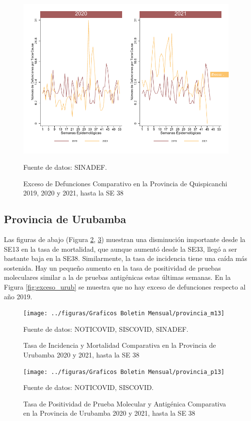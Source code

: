 \documentclass[12pt,a4paper,openany]{book}
\begin{document}
	\begin{figure}[h]
	\caption{Exceso de Defunciones Comparativo en la Provincia de Quispicanchi 2019, 2020 y 2021, hasta la SE 38}\label{fig:exceso_quisp}
	\begin{center}
		\includegraphics[width=0.7\linewidth]{../figuras/exceso_12}
	\end{center}
	{\footnotesize {Fuente de datos: SINADEF.}}
	\end{figure}

\clearpage

	\subsection*{Provincia de Urubamba}
	\noindent Las figuras de abajo (Figura \ref{fig:inc_urub}, \ref{fig:positividad_urub})  muestran una disminución importante desde la SE13 en la tasa de mortalidad, que aunque aumentó desde la SE33, llegó a ser bastante baja en la SE38. Similarmente, la tasa de incidencia tiene una caída más sostenida. Hay un pequeño aumento en la tasa de positividad de pruebas moleculares similar a la de pruebas antigénicas estas últimas semanas. En la Figura \ref{fig:exceso_urub} se muestra que no hay exceso de defunciones respecto al año 2019.

	\begin{figure}[h]
	\caption{Tasa de Incidencia y Mortalidad Comparativa en la Provincia de Urubamba 2020 y 2021, hasta la SE 38}\label{fig:inc_urub}
	\begin{center}
		\texttt{[image: ../figuras/Graficos Boletin Mensual/provincia\_m13]}
	\end{center}
	{\footnotesize {Fuente de datos: NOTICOVID, SISCOVID, SINADEF.}}
	\end{figure}

	\begin{figure}[h]
	\caption{Tasa de Positividad de Prueba Molecular y Antigénica Comparativa en la Provincia de Urubamba 2020 y 2021, hasta la SE 38}\label{fig:positividad_urub}
	\begin{center}
		\texttt{[image: ../figuras/Graficos Boletin Mensual/provincia\_p13]}
	\end{center}
	{\footnotesize {Fuente de datos: NOTICOVID, SISCOVID.}}
	\end{figure}
\end{document}
